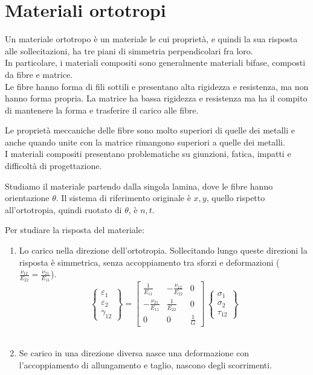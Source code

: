 \section{Materiali ortotropi}

Un materiale ortotropo è un materiale le cui proprietà, e quindi la sua risposta alle sollecitazioni, ha tre piani di simmetria perpendicolari fra loro.\\
In particolare, i materiali compositi sono generalmente materiali bifase, composti da fibre e matrice.\\
Le fibre hanno forma di fili sottili e presentano alta rigidezza e resistenza, ma non hanno forma propria. La matrice ha bassa rigidezza e resistenza ma ha il compito di mantenere la forma e trasferire il carico alle fibre.

Le proprietà meccaniche delle fibre sono molto superiori di quelle dei metalli e anche quando unite con la matrice rimangono superiori a quelle dei metalli.\\
I materiali compositi presentano problematiche su giunzioni, fatica, impatti e difficoltà di progettazione.

Studiamo il materiale partendo dalla singola lamina, dove le fibre hanno orientazione $\theta$. Il sistema di riferimento originale è $x, y$, quello rispetto all'ortotropia, quindi ruotato di   $\theta$, è $n, t$.

Per studiare la risposta del materiale:
\begin{enumerate}
    \item Lo carico nella direzione dell'ortotropia. Sollecitando lungo queste direzioni la risposta è simmetrica, senza accoppiamento tra sforzi e deformazioni ($\frac{\nu_{12}}{E_{22}}=\frac{\nu_{21}}{E_{11}}$).
    \begin{equation*}
\left\{
\begin{array}{c}
\varepsilon_{1} \\
\varepsilon_{2} \\
\gamma_{12}
\end{array}
\right\}
=
\left[
\begin{array}{ccc}
\displaystyle \frac{1}{E_{11}} & \displaystyle-\frac{\nu_{12}}{E_{22}} & 0\\
\displaystyle -\frac{\nu_{21}}{E_{11}} & \displaystyle\frac{1}{E_{22}} &0 \\
0& 0 & \displaystyle\frac{1}{G}
\end{array}
\right]\,
\left\{
\begin{array}{c}
\sigma_{1} \\
\sigma_{2} \\
\tau_{12}
\end{array}
\right\}
\end{equation*}
    \\
    \item Se carico in una direzione diversa nasce una deformazione con l'accoppiamento di allungamento e taglio, nascono degli scorrimenti.
\end{enumerate}

